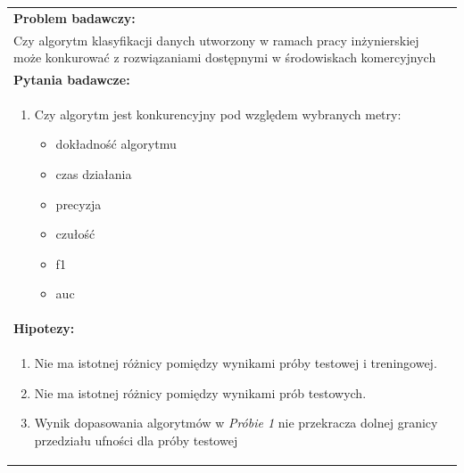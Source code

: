 \begin{table}[H]
    \centering
    \begin{tabular}{|L{\textwidth}|}
        \hline
        \textbf{Problem badawczy:}                                                                                                                     \\
        Czy algorytm klasyfikacji danych utworzony w ramach pracy inżynierskiej może konkurować z rozwiązaniami dostępnymi w środowiskach komercyjnych \\ \hline

        \textbf{Pytania badawcze:}                                                                                                                     \\
        \begin{enumerate}
            \item Czy algorytm jest konkurencyjny pod względem wybranych metry:
            \begin{itemize}
                \item dokładność algorytmu
                \item czas działania
                \item precyzja
                \item czułość
                \item f1
                \item auc
            \end{itemize}
        \end{enumerate}                                                                                                                                \\ \hline

        \textbf{Hipotezy:}                                                                                                                             \\
        \begin{enumerate}
            \item Nie ma istotnej różnicy pomiędzy wynikami próby testowej i treningowej.
            \item Nie ma istotnej różnicy pomiędzy wynikami prób testowych.
            \item Wynik dopasowania algorytmów w \textit{Próbie 1} nie przekracza dolnej granicy przedziału ufności dla próby testowej
        \end{enumerate}                                                                                                                                \\ \hline
    \end{tabular}
    \label{tab:met-bad}
\end{table}


